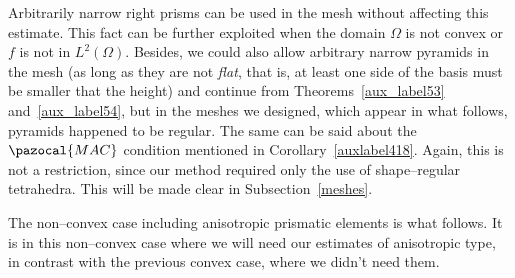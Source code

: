 Arbitrarily narrow right prisms can be used in the mesh without 
affecting this estimate. This fact can be further exploited when the
domain $\Omega$ is not convex or $f$ is not in $L^2(\Omega)$. Besides, we could
also allow arbitrary narrow pyramids in the mesh (as long as they are not \textit{flat},
that is, at least one side of the basis must be smaller that the height) and
continue from Theorems~\ref{aux_label53} and~\ref{aux_label54}, but in the meshes we 
designed, which appear in what follows, pyramids happened to be regular. 
The same can be said about the $\pazocal{MAC}$ condition mentioned
in Corollary~\ref{auxlabel418}. Again, this is not a restriction, since
our method required only the use of shape--regular tetrahedra. This will be made clear
in Subsection~\ref{meshes}.

The non--convex case including anisotropic prismatic elements is what follows. It is in
this non--convex case where we will need our estimates of anisotropic type,
in contrast with the previous convex case, where we didn't need them.
